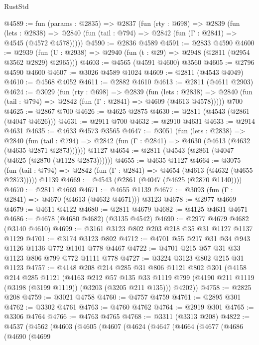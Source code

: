\begin{lexlean}{RustStd}
\begin{coremodule}
@4589 := fun (params : @2835) =>
  @2837
    (fun (rty : @698) =>
    @2839
      (fun (lets : @2838) =>
      @2840 (fun (tail : @794) => @2842 (fun (Γ : @2841) => @4545 (@4572 @4578)))))
@4590 := @2836 @4589
@4591 := @2833 @4590
@4600 := @2939 (fun (U : @2938) => @2940 (fun (t : @29) => @2948 (@2811 (@2954 @3562 @2829) @2965)))
@4603 := @4565 (@4591 @4600) @3560
@4605 := @2796 @4590 @4600
@4607 := @3026 @4589 @1024
@4609 := @2811 (@4543 @4049)
@4610 := @4568 @4052
@4611 := @2882 @4610
@4613 := @2811 (@4611 @2903)
@4624 := @3029
    (fun (rty : @698) =>
    @2839
      (fun (lets : @2838) =>
      @2840 (fun (tail : @794) => @2842 (fun (Γ : @2841) => @4609 (@4613 @4578)))))
    @700
@4625 := @2867 @700
@4626 := @4625 @2875
@4630 := @2811 (@4543 (@2861 (@4047 @4626)))
@4631 := @2911 @700
@4632 := @2910 @4631
@4633 := @2914 @4631
@4635 := @4633 @4573 @3565
@4647 := @3051
    (fun (lets : @2838) =>
    @2840
      (fun (tail : @794) => @2842 (fun (Γ : @2841) => @4630 (@4613 (@4632 (@4635 @2871 @2873))))))
    @1127
@4654 := @2811 (@4543 (@2861 (@4047 (@4625 (@2870 (@1128 @2873))))))
@4655 := @4635 @1127
@4664 := @3075
    (fun (tail : @794) => @2842 (fun (Γ : @2841) => @4654 (@4613 (@4632 (@4655 @2873)))))
    @1139
@4669 := @4543 (@2861 (@4047 (@4625 (@2870 @1140))))
@4670 := @2811 @4669
@4671 := @4655 @1139
@4677 := @3093 (fun (Γ : @2841) => @4670 (@4613 (@4632 @4671))) @3123
@4678 := @2977 @4669
@4679 := @4611 @4122
@4680 := @2811 @4679
@4682 := @4125 @4631 @4671
@4686 := @4678 (@4680 @4682) (@3135 @4542)
@4690 := @2977 @4679 @4682 (@3140 @4610)
@4699 := @3161 @3123 @802 @203 @218 @35 @31 @1127 @1137 @1129
@4701 := @3174 @3123 @802
@4712 := @4701 @55 @217 @31 @34 @943 @1126 @1136 @772 @1101 @778 @4467
@4722 := @4701 @215 @57 @31 @33 @1123 @806 @799 @772 @1111 @778
@4727 := @3224 @3123 @802 @215 @31 @1123
@4757 := @4148
    @208
    @214
    @285
    @31
    @806
    @1121
    @802
    @301
    (@4158
      @214
      @285
      @1121
      (@4163
        @212
        @57
        @135
        @33
        @1119
        @799
        (@4190 @211 @1119 (@3198 (@3199 @1119)) (@3203 (@3205 @211 @135)))
        @4202))
@4758 := @2825 @208
@4759 := @3021 @4758
@4760 := @4757 @4759
@4761 := @2895 @301
@4762 := @3302 @4761
@4763 := @4760 @4762
@4764 := @2919 @301
@4765 := @3306 @4764
@4766 := @4763 @4765
@4768 := @3311 (@3313 @208)
@4822 := @4537
    (@4562
      (@4603
        (@4605
          (@4607
            (@4624
              (@4647
                (@4664
                  (@4677
                    (@4686
                      (@4690
                        (@4699

\end{coremodule}
\end{lexlean}
